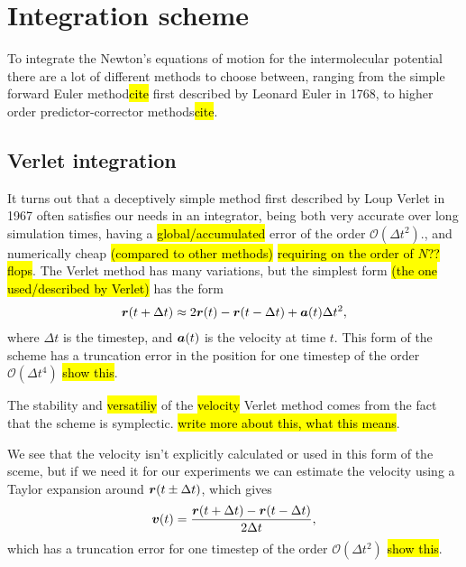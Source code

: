 \section{Integration scheme}
To integrate the Newton's equations of motion for the intermolecular potential there are a lot of different methods to choose between, ranging from the simple forward Euler method\hl{cite} first described by Leonard Euler in 1768, to higher order predictor-corrector methods\hl{cite}. 

\subsection{Verlet integration}

It turns out that a deceptively simple method first described by Loup Verlet in 1967\cite{verlet1967computer} often satisfies our needs in an integrator, being both very accurate over long simulation times, having a \hl{global/accumulated} error of the order $\mathcal{O}(\Delta t^2)$., and numerically cheap \hl{(compared to other methods)} \hl{requiring on the order of $N$?? flops}. The Verlet method has many variations, but the simplest form \hl{(the one used/described by Verlet)} has the form
\begin{align}
    \boldsymbol{r}(t + \Delta t) \approx 2\boldsymbol{r}(t) - \boldsymbol{r}(t - \Delta t) + \boldsymbol{a}(t)\Delta t^2,
    \label{eq:regular_verlet}
\end{align}
where $\Delta t$ is the timestep, and $\boldsymbol{a}(t)$ is the velocity at time $t$. This form of the scheme has a truncation error in the position for one timestep of the order $\mathcal{O}(\Delta t^4)$ \hl{show this}.

The stability and \hl{versatiliy} of the \hl{velocity} Verlet method comes from the fact that the scheme is symplectic. \hl{write more about this, what this means}.

We see that the velocity isn't explicitly calculated or used in this form of the sceme, but if we need it for our experiments we can estimate the velocity using a Taylor expansion around $\boldsymbol{r}(t\pm\Delta t)$, which gives
\begin{align*}
    \boldsymbol{v}(t) = \frac{\boldsymbol{r}(t + \Delta t) - \boldsymbol{r}(t - \Delta t)}{2\Delta t},
\end{align*}
which has a truncation error for one timestep of the order $\mathcal{O}(\Delta t^2)$ \hl{show this}. 

